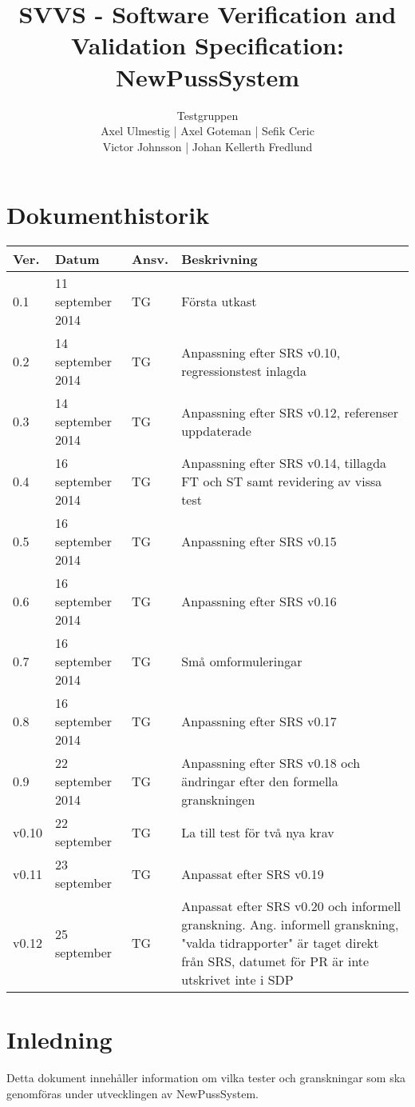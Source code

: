 \documentclass[a4paper]{article}
\title{SVVS - Software Verification and Validation Specification: NewPussSystem}
\author{Testgruppen \\ Axel Ulmestig | Axel Goteman | Sefik Ceric \\ Victor Johnsson | Johan Kellerth Fredlund}
\date{}
\begin{document}
\maketitle
\thispagestyle{fancy}
\tableofcontents
\newpage

\section*{Dokumenthistorik}

\begin{tabular}{ l l l p{9cm} }
Ver. & Datum & Ansv. & Beskrivning \\\hline
0.1 & 11 september 2014 & TG & Första utkast \\
0.2 & 14 september 2014 & TG & Anpassning efter SRS v0.10, regressionstest inlagda \\
0.3 & 14 september 2014 & TG & Anpassning efter SRS v0.12, referenser uppdaterade\\
0.4 & 16 september 2014 & TG & Anpassning efter SRS v0.14, tillagda FT och ST samt revidering av vissa test\\
0.5 & 16 september 2014 & TG & Anpassning efter SRS v0.15\\
0.6 & 16 september 2014 & TG & Anpassning efter SRS v0.16\\
0.7 & 16 september 2014 & TG & Små omformuleringar \\
0.8 & 16 september 2014 & TG & Anpassning efter SRS v0.17\\
0.9 & 22 september 2014 & TG & Anpassning efter SRS v0.18 och ändringar efter den formella granskningen \\
v0.10 & 22 september & TG & La till test för två nya krav \\
v0.11 & 23 september & TG & Anpassat efter SRS v0.19 \\
v0.12 & 25 september & TG & Anpassat efter SRS v0.20 och informell granskning. Ang. informell granskning, "valda tidrapporter" är taget direkt från SRS, datumet för PR är inte utskrivet inte i SDP\\

\end{tabular}
\section{Inledning}       

Detta dokument innehåller information om vilka tester och granskningar som ska genomföras under utvecklingen av NewPussSystem.
\end{document}
